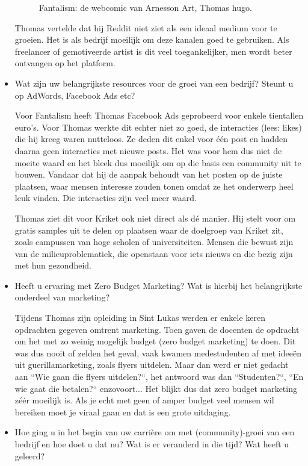 \begin{itemize}
\begin{figure}[h!]
		\centering
		\caption{Fantalism: de webcomic van Arnesson Art, Thomas hugo.}
		\label{fig:fantalism}
	\end{figure}
	Thomas vertelde dat hij Reddit niet ziet als een ideaal medium voor te groeien. Het is als bedrijf moeilijk om deze kanalen goed te gebruiken. Als freelancer of gemotiveerde artist is dit veel toegankelijker, men wordt beter ontvangen op het platform.
	
	\item Wat zijn uw belangrijkste resources voor de groei van een bedrijf? Steunt u op AdWords, Facebook Ads etc?
	
	Voor Fantalism heeft Thomas Facebook Ads geprobeerd voor enkele tientallen euro's. Voor Thomas werkte dit echter niet zo goed, de interacties (lees: likes) die hij kreeg waren nutteloos. Ze deden dit enkel voor één post en hadden daarna geen interacties met nieuwe posts. Het was voor hem dus niet de moeite waard en het bleek dus moeilijk om op die basis een community uit te bouwen. Vandaar dat hij de aanpak behoudt van het posten op de juiste plaatsen, waar mensen interesse zouden tonen omdat ze het onderwerp heel leuk vinden. Die interacties zijn veel meer waard.
	
	Thomas ziet dit voor Kriket ook niet direct als dé manier. Hij stelt voor om gratis samples uit te delen op plaatsen waar de doelgroep van Kriket zit, zoals campussen van hoge scholen of universiteiten. Mensen die bewust zijn van de milieuproblematiek, die openstaan voor iets nieuws en die bezig zijn met hun gezondheid.
	
	
	\item Heeft u ervaring met Zero Budget Marketing? Wat is hierbij het belangrijkste onderdeel van marketing?
	
	Tijdens Thomas zijn opleiding in Sint Lukas werden er enkele keren opdrachten gegeven omtrent marketing. Toen gaven de docenten de opdracht om het met zo weinig mogelijk budget (zero budget marketing) te doen. Dit was dus nooit of zelden het geval, vaak kwamen medestudenten af met ideeën uit guerillamarketing, zoals flyers uitdelen. Maar dan werd er niet gedacht aan ``Wie gaan die flyers uitdelen?``, het antwoord was dan ``Studenten?``, ``En wie gaat die betalen?`` enzovoort... Het blijkt dus dat zero budget marketing zéér moeilijk is. Als je echt met geen of amper budget veel mensen wil bereiken moet je viraal gaan en dat is een grote uitdaging.
	
	\item Hoe ging u in het begin van uw carrière om met (community)-groei van een bedrijf en hoe doet u dat nu? Wat is er veranderd in die tijd? Wat heeft u geleerd?
	

\end{itemize}
